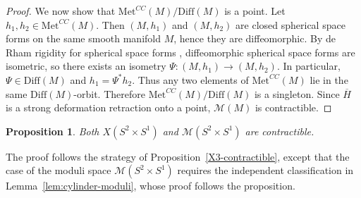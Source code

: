 \documentclass[12pt,oneside,a4paper]{article}
\newtheorem{proposition}[definition]{Proposition}
\theoremstyle{mytheorem}
\theoremstyle{remark}
\theoremstyle{definition}
\begin{document}
\begin{proof}
We now show that $\mathrm{Met}^{CC}(M)/\mathrm{Diff}(M)$ is a point.
Let $h_1,h_2\in \mathrm{Met}^{CC}(M)$. Then $(M,h_1)$ and $(M,h_2)$ are closed
spherical space forms on the same smooth manifold $M$, hence they are
diffeomorphic. By de Rham rigidity for spherical space forms
\cite[pp.~66--67]{MR43468}, diffeomorphic spherical space forms are
isometric, so there
exists an isometry $\Psi\colon(M,h_1)\to (M,h_2)$.
In particular, $\Psi\in \mathrm{Diff}(M)$ and
$h_1=\Psi^*h_2.$ Thus any two elements of $\mathrm{Met}^{CC}(M)$ lie in the same
$\mathrm{Diff}(M)$-orbit. Therefore $\mathrm{Met}^{CC}(M)/\mathrm{Diff}(M)$
is a singleton. Since $\overline H$ is a strong deformation retraction onto a
point, $\mathcal{M}(M)$ is contractible.
\end{proof}

\begin{proposition}\label{prop:X-and-M-S2S1-contractible}
  Both $X(S^2\times S^1)$ and $\mathcal{M}(S^2\times S^1)$ are contractible.
\end{proposition}

The proof follows the strategy of Proposition~\ref{X3-contractible}, except
that the case of the moduli space
$\mathcal{M}(S^2\times S^1)$ requires the independent classification in
Lemma~\ref{lem:cylinder-moduli}, whose proof follows the proposition.
\end{document}
